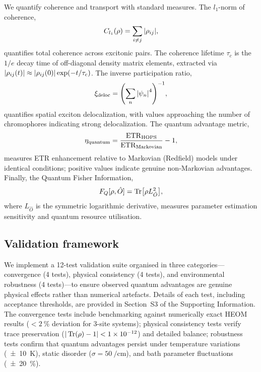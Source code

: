 We quantify coherence and transport with standard measures. The $l_1$-norm of coherence,
\begin{equation}\label{eq:l1_coherence}
C_{l_1}(\rho) = \sum_{i \neq j} \abs{\rho_{ij}},
\end{equation}
quantifies total coherence across excitonic pairs. The coherence lifetime $\tau_c$ is the $1/e$ decay time of off-diagonal density matrix elements, extracted via $\abs{\rho_{ij}(t)} \approx \abs{\rho_{ij}(0)} \exp(-t/\tau_c)$. The inverse participation ratio,
\begin{equation}\label{eq:IPR}
\xi_{\rm deloc} = \qty( \sum_n \abs{\psi_n}^4 )^{-1},
\end{equation}
quantifies spatial exciton delocalization, with values approaching the number of chromophores indicating strong delocalization. The quantum advantage metric,
\begin{equation}\label{eq:quantum_advantage}
\eta_{\rm quantum} = \frac{\mathrm{ETR}_{\rm HOPS}}{\mathrm{ETR}_{\rm Markovian}} - 1,
\end{equation}
measures ETR enhancement relative to Markovian (Redfield) models under identical conditions; positive values indicate genuine non-Markovian advantages. Finally, the Quantum Fisher Information,
\begin{equation}\label{eq:QFI}
F_Q[\rho, \hat{O}] = \Tr[\rho L_{\hat{O}}^2],
\end{equation}
where $L_{\hat{O}}$ is the symmetric logarithmic derivative, measures parameter estimation sensitivity and quantum resource utilisation.

\subsection{Validation framework}

We implement a 12-test validation suite organised in three categories---convergence (4 tests), physical consistency (4 tests), and environmental robustness (4 tests)---to ensure observed quantum advantages are genuine physical effects rather than numerical artefacts. Details of each test, including acceptance thresholds, are provided in Section~S3 of the Supporting Information. The convergence tests include benchmarking against numerically exact HEOM results \cite{Suess2014} ($<\SI{2}{\percent}$ deviation for 3-site systems); physical consistency tests verify trace preservation ($|\Tr(\rho) - 1| < \num{1e-12}$) and detailed balance; robustness tests confirm that quantum advantages persist under temperature variations (\SIlist{\pm 10}{\kelvin}), static disorder ($\sigma = \SI{50}{\per\centi\meter}$), and bath parameter fluctuations (\SIlist{\pm 20}{\percent}).

